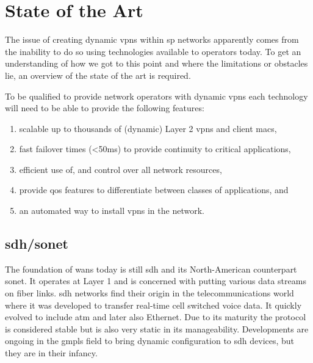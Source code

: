 \section{State of the Art} %
\label{sec:state_of_the_art}

The issue of creating dynamic \acp{vpn} within \ac{sp} networks apparently comes from the inability to do so using technologies available to operators today. To get an understanding of how we got to this point and where the limitations or obstacles lie, an overview of the state of the art is required.

To be qualified to provide network operators with dynamic \acp{vpn} each technology will need to be able to provide the following features:

\begin{enumerate}
	\item scalable up to thousands of (dynamic) Layer 2 \acp{vpn} and client \acsp{mac},
	\item fast failover times (<50ms) to provide continuity to critical applications,
	\item efficient use of, and control over all network resources,
	\item provide \acl{qos} features to differentiate between classes of applications, and
	\item an automated way to install \acp{vpn} in the network.
\end{enumerate}

\subsection{\acs{sdh}/\acs{sonet}} %
\label{sub:sdh_sonet}
The foundation of \acp{wan} today is still \ac{sdh} and its North-American counterpart \ac{sonet}. It operates at Layer 1 and is concerned with putting various data streams on fiber links. \ac{sdh} networks find their origin in the telecommunications world where it was developed to transfer real-time cell switched voice data. It quickly evolved to include \ac{atm} and later also Ethernet. Due to its maturity the protocol is considered stable but is also very static in its manageability. Developments are ongoing in the \ac{gmpls} field to bring dynamic configuration to \ac{sdh} devices, but they are in their infancy.


